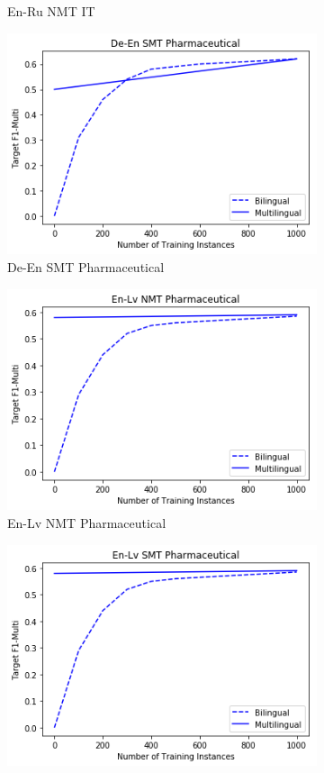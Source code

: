 \begin{figure}
\begin{subfigure}[b]{\figlength}
		\caption{En-Ru NMT IT}
		\label{fig:en_ru_nmt_it_results}
	\end{subfigure}
	\begin{subfigure}[b]{\figlength}
		\centering\includegraphics[width=\figlength]{figures/translation_quality_estimation/word_level/de_en_smt_pharm.png}
		\caption{De-En SMT Pharmaceutical}
		\label{fig:de_en_smt_pharm_results}
	\end{subfigure}
	\begin{subfigure}[b]{\figlength}
		\centering\includegraphics[width=\figlength]{figures/translation_quality_estimation/word_level/en_lv_nmt_pharm.png}
		\caption{En-Lv NMT Pharmaceutical}
		\label{fig:en_lv_nmt_Pharm_results}
	\end{subfigure}
	\begin{subfigure}[b]{\figlength}
		\centering\includegraphics[width=\figlength]{figures/translation_quality_estimation/word_level/en_lv_smt_pharm.png}

\end{subfigure}
\end{figure}
